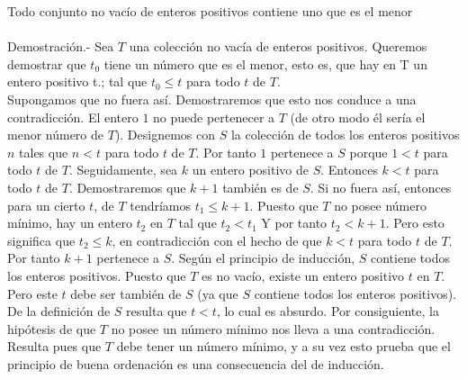 \begin{teo}
Todo conjunto no vacío de enteros positivos contiene uno que es el menor \\\\
Demostración.- \; Sea $T$ una colección no vacía de enteros positivos. Queremos demostrar que $t_0$ tiene un número que es el menor, esto es, que hay en T un entero positivo t.; tal que $t_0\leq t$ para todo $t$ de $T$.\\
Supongamos que no fuera así. Demostraremos que esto nos conduce a una contradicción. El entero $1$ no puede pertenecer a $T$ (de otro modo él sería el menor número de $T$). Designemos con $S$ la colección de todos los enteros positivos $n$ tales que $n<t$ para todo $t$ de $T$. Por tanto $1$ pertenece a $S$ porque $1 < t$ para todo $t$ de $T$. Seguidamente, sea $k$ un entero positivo de $S$. Entonces $k < t$ para todo $t$ de $T$. Demostraremos que $k + 1$ también es de $S$. Si no fuera así, entonces para un cierto $t$, de $T$ tendríamos $t_1 \leq k+1$. Puesto que $T$ no posee número mínimo, hay un entero $t_2$ en $T$ tal que $t_2 < t_1$ Y por tanto $t_2 < k + 1$. Pero esto significa que $t_2 \leq k$, en contradicción con el hecho de que $k < t$ para todo $t$ de $T$. Por tanto $k + 1$ pertenece a $S$. Según el principio de inducción, $S$ contiene todos los enteros positivos. Puesto que $T$ es no vacío, existe un entero positivo $t$ en $T$. Pero este $t$ debe ser también de $S$ (ya que $S$ contiene todos los enteros positivos). De la definición de $S$ resulta que $t < t$, lo cual es absurdo. Por consiguiente, la hipótesis de que $T$ no posee un número mínimo nos lleva a una contradicción. Resulta pues que $T$ debe tener un número mínimo, y a su vez esto prueba que el principio de buena ordenación es una consecuencia del de inducción.\\\\
\end{teo}

